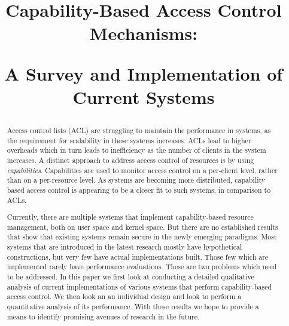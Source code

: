 \documentclass[conference]{IEEEtran}
\begin{document}
\title{{Capability-Based Access Control Mechanisms:} \\ \centerline{\Large{A Survey and Implementation of Current Systems}}}

\author{
  \and
  \and
    

}

\date{}


\maketitle
\begin{abstract}
Access control lists (ACL) are struggling to maintain the performance in systems, as the requirement for scalability in these systems increases. ACLs lead to higher overheads which in turn leads to inefficiency as the number of clients in the system increases. A distinct approach to address access control of resources is by using \textit{capabilities}. Capabilities are used to monitor access control on a per-client level, rather than on a per-resource level. As systems are becoming more distributed, capability based access control is appearing to be a closer fit to such systems, in comparison to ACLs.

Currently, there are multiple systems that implement capability-based resource management, both on user space and kernel space. But there are no established results that show that existing systems remain secure in the newly emerging paradigms. Most systems that are introduced in the latest research mostly have hypothetical constructions, but very few have actual implementations built. Those few which are implemented rarely have performance evaluations. These are two problems which need to be addressed. In this paper we first look at conducting a detailed qualitative analysis of current implementations of various systems that perform capability-based access control. We then look an an individual design and look to perform a quantitative analysis of its performance. With these results we hope to provide a means to identify promising avenues of research in the future. 
\end{abstract}
\end{document}
